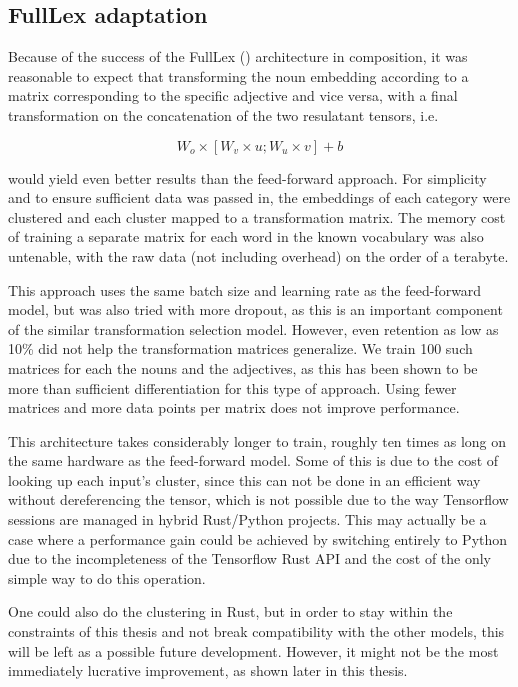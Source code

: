 \documentclass[a4paper, 12pt]{article}
\begin{document}
\subsection{FullLex adaptation}
Because of the success of the FullLex (\cite{SocherFullLex}) architecture in composition, it was reasonable to expect that transforming the noun embedding according to a matrix corresponding to the specific adjective and vice versa, with a final transformation on the concatenation of the two resulatant tensors, i.e.

\begin{equation} \label{eq:6}
	W_o \times [W_v \times u; W_u \times v] + b
\end{equation}

would yield even better results than the feed-forward approach. For simplicity and to ensure sufficient data was passed in, the embeddings of each category were clustered and each cluster mapped to a transformation matrix. The memory cost of training a separate matrix for each word in the known vocabulary was also untenable, with the raw data (not including overhead) on the order of a terabyte.

This approach uses the same batch size and learning rate as the feed-forward model, but was also tried with more dropout, as this is an important component of the similar transformation selection model. However, even retention as low as 10\% did not help the transformation matrices generalize. We train 100 such matrices for each the nouns and the adjectives, as this has been shown to be more than sufficient differentiation for this type of approach. Using fewer matrices and more data points per matrix does not improve performance.

This architecture takes considerably longer to train, roughly ten times as long on the same hardware as the feed-forward model. Some of this is due to the cost of looking up each input's cluster, since this can not be done in an efficient way without dereferencing the tensor, which is not possible due to the way Tensorflow sessions are managed in hybrid Rust/Python projects. This may actually be a case where a performance gain could be achieved by switching entirely to Python due to the incompleteness of the Tensorflow Rust API and the cost of the only simple way to do this operation.

One could also do the clustering in Rust, but in order to stay within the constraints of this thesis and not break compatibility with the other models, this will be left as a possible future development. However, it might not be the most immediately lucrative improvement, as shown later in this thesis.
\end{document}
